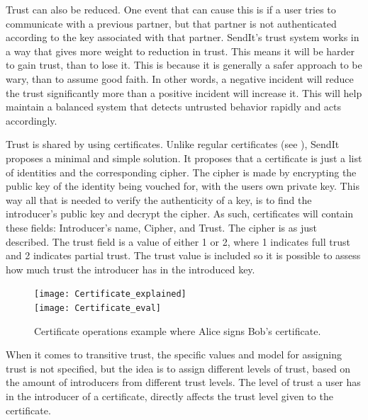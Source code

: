 		Trust can also be reduced. One event that can cause this is if a user tries to communicate with a previous partner, but that partner is not authenticated according to the key associated with that partner. SendIt's trust system works in a way that gives more weight to reduction in trust. This means it will be harder to gain trust, than to lose it. This is because it is generally a safer approach to be wary, than to assume good faith. In other words, a negative incident will reduce the trust significantly more than a positive incident will increase it. This will help maintain a balanced system that detects untrusted behavior rapidly and acts accordingly.

		Trust is shared by using certificates. Unlike regular certificates (see ), SendIt proposes a minimal and simple solution. It proposes that a certificate is just a list of identities and the corresponding cipher. The cipher is made by encrypting the public key of the identity being vouched for, with the users own private key. This way all that is needed to verify the authenticity of a key, is to find the introducer's public key and decrypt the cipher. As such, certificates will contain these fields: Introducer's name, Cipher, and Trust. The cipher is as just described. The trust field is a value of either 1 or 2, where 1 indicates full trust and 2 indicates partial trust. The trust value is included so it is possible to assess how much trust the introducer has in the introduced key.
		\begin{figure}
		  \centering
		  \texttt{[image: Certificate\_explained]}\\
		  \vspace{1cm}
		  \texttt{[image: Certificate\_eval]}
		  \centering
		  \decoRule
		  \caption[Certificate transfer and evaluation]{Certificate operations example where Alice signs Bob's certificate.}
		  \label{fig:cert_ex}
		\end{figure}

		When it comes to transitive trust, the specific values and model for assigning trust is not specified, but the idea is to assign different levels of trust, based on the amount of introducers from different trust levels. The level of trust a user has in the introducer of a certificate, directly affects the trust level given to the certificate.

